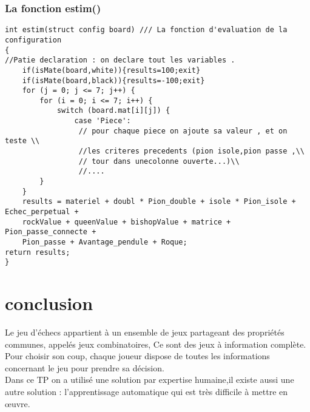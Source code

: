 \documentclass[12pt]{report}
\begin{document}
\subsection{La fonction estim()}
\lstset{language=C}
\lstset{basicstyle=\footnotesize}
\begin{lstlisting}
int estim(struct config board) /// La fonction d'evaluation de la configuration
{
//Patie declaration : on declare tout les variables .
	if(isMate(board,white)){results=100;exit}
	if(isMate(board,black)){results=-100;exit}
	for (j = 0; j <= 7; j++) {
		for (i = 0; i <= 7; i++) {
			switch (board.mat[i][j]) {
				case 'Piece':
				 // pour chaque piece on ajoute sa valeur , et on teste \\
				 //les criteres precedents (pion isole,pion passe ,\\
				 // tour dans unecolonne ouverte...)\\
				 //....   
		}
	}
	results = materiel + doubl * Pion_double + isole * Pion_isole + Echec_perpetual +
	rockValue + queenValue + bishopValue + matrice + Pion_passe_connecte +
	Pion_passe + Avantage_pendule + Roque;
return results;		
}
\end{lstlisting}
	
\chapter{conclusion}
Le jeu d’échecs appartient à un ensemble de jeux partageant des propriétés communes,
appelés jeux combinatoires, Ce sont des jeux à information complète. \\

Pour choisir son coup, chaque joueur dispose de toutes les informations concernant le jeu pour prendre sa décision.
\\

Dans ce TP on a utilisé une solution par expertise humaine,il existe aussi une autre solution : l'apprentissage automatique qui est très difficile à mettre en œuvre.
\\
\end{document}
